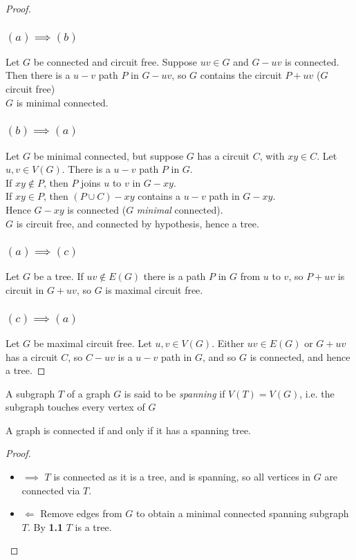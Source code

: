 \documentclass[10pt,a4paper]{article}
\begin{document}
\begin{proof}
\subsubsection*{$(a) \implies (b)$}
Let $G$ be connected and circuit free. Suppose $uv\in G$ and $G-uv$ is connected. Then there is a $u-v$ path $P$ in $G-uv$, so $G$ contains the circuit $P+uv$ \contr ($G$ circuit free)\\
\therefore $G$ is minimal connected.
\subsubsection*{$(b) \implies (a)$}
Let $G$ be minimal connected, but suppose $G$ has a circuit $C$, with $xy \in C$. Let $u, v \in V(G)$. There is a $u-v$ path $P$ in $G$.\\
If $xy \notin P$, then $P$ joins $u$ to $v$ in $G-xy$.\\
If $xy \in P$, then $(P\cup C)-xy$ contains a $u-v$ path in $G-xy$.\\
Hence $G-xy$ is connected \contr ($G$ \emph{minimal} connected).\\
\therefore $G$ is circuit free, and connected by hypothesis, hence a tree.
\subsubsection*{$(a) \implies (c)$}
Let $G$ be a tree. If $uv \notin E(G)$ there is a path $P$ in $G$ from $u$ to $v$, so $P+uv$ is circuit in $G+uv$, so $G$ is maximal circuit free.
\subsubsection*{$(c) \implies (a)$}
Let $G$ be maximal circuit free. Let $u,v \in V(G)$. Either $uv \in E(G)$ or $G+uv$ has a circuit $C$, so $C-uv$ is a $u-v$ path in $G$, and so $G$ is connected, and hence a tree.
\end{proof}

A subgraph $T$ of a graph $G$ is said to be \emph{spanning} if $V(T) = V(G)$, i.e. the subgraph touches every vertex of $G$
\begin{corollary}
A graph is connected if and only if it has a spanning tree.
\end{corollary}
\begin{proof}
\item
\begin{itemize}
\item{$\implies$} $T$ is connected as it is a tree, and is spanning, so all vertices in $G$ are connected via $T$.
\item{$\Longleftarrow$} Remove edges from $G$ to obtain a minimal connected spanning subgraph $T$. By \textbf{1.1} $T$ is a tree.
\end{itemize}
\end{proof}
\end{document}

